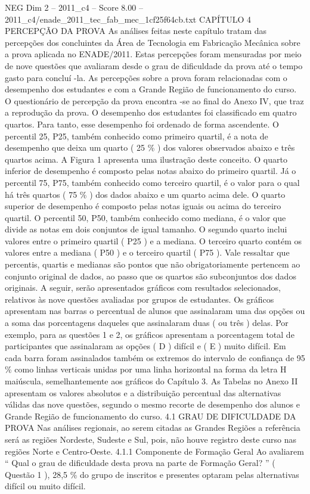 \begin{textsample}{NEG Dim 2 – 2011\_c4 – Score 8.00 – 2011\_c4/enade\_2011\_tec\_fab\_mec\_1cf25f64cb.txt}  \label{ex:f2_neg_310}
CAPÍTULO 4 PERCEPÇÃO DA PROVA As análises feitas neste capítulo tratam das percepções dos concluintes da Área de Tecnologia em Fabricação Mecânica sobre a prova aplicada no ENADE/2011.
Estas percepções foram mensuradas por meio de nove questões que avaliaram desde o grau de dificuldade da prova até o tempo gasto para concluí -la.
As percepções sobre a prova foram relacionadas com o desempenho dos estudantes e com a Grande Região de funcionamento do curso.
O questionário de percepção da prova encontra -se ao final do Anexo IV, que traz a reprodução da prova.
O desempenho dos estudantes foi classificado em quatro quartos.
Para tanto, esse desempenho foi ordenado de forma ascendente.
O percentil 25, P25, também conhecido como primeiro quartil, é a nota de desempenho que deixa um quarto ( 25 \% ) dos valores observados abaixo e três quartos acima.
A Figura 1 apresenta uma ilustração deste conceito.
O quarto inferior de desempenho é composto pelas notas abaixo do primeiro quartil.
Já o percentil 75, P75, também conhecido como terceiro quartil, é o valor para o qual há três quartos ( 75 \% ) dos dados abaixo e um quarto acima dele.
O quarto superior de desempenho é composto pelas notas iguais ou acima do terceiro quartil.
O percentil 50, P50, também conhecido como mediana, é o valor que divide as notas em dois conjuntos de igual tamanho.
O segundo quarto inclui valores entre o primeiro quartil ( P25 ) e a mediana.
O terceiro quarto contém os valores entre a mediana ( P50 ) e o terceiro quartil ( P75 ).
Vale ressaltar que percentis, quartis e medianas são pontos que não obrigatoriamente pertencem ao conjunto original de dados, ao passo que os quartos são subconjuntos dos dados originais.
A seguir, serão apresentados gráficos com resultados selecionados, relativos às nove questões avaliadas por grupos de estudantes.
Os gráficos apresentam nas barras o percentual de alunos que assinalaram uma das opções ou a soma das porcentagens daqueles que assinalaram duas ( ou três ) delas.
Por exemplo, para as questões 1 e 2, os gráficos apresentam a porcentagem total de participantes que assinalaram as opções ( D ) difícil e ( E ) muito difícil.
Em cada barra foram assinalados também os extremos do intervalo de confiança de 95 \% como linhas verticais unidas por uma linha horizontal na forma da letra H maiúscula, semelhantemente aos gráficos do Capítulo 3.
As Tabelas no Anexo II apresentam os valores absolutos e a distribuição percentual das alternativas válidas das nove questões, segundo o mesmo recorte de desempenho dos alunos e Grande Região de funcionamento do curso. 4.1 GRAU DE DIFICULDADE DA PROVA Nas análises regionais, ao serem citadas as Grandes Regiões a referência será as regiões Nordeste, Sudeste e Sul, pois, não houve registro deste curso nas regiões Norte e Centro-Oeste. 4.1.1 Componente de Formação Geral Ao avaliarem “ Qual o grau de dificuldade desta prova na parte de Formação Geral? ” ( Questão 1 ), 28,5 \% do grupo de inscritos e presentes optaram pelas alternativas difícil ou muito difícil.

\end{textsample}
